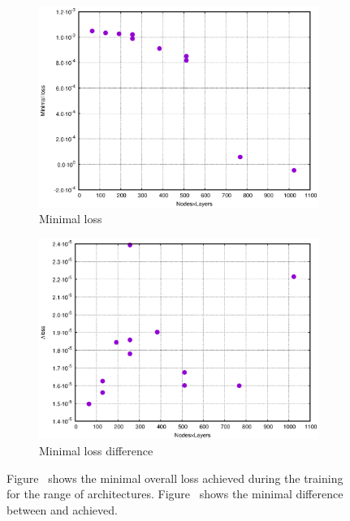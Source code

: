 \begin{figure}[htbp]
    \centering
    \begin{subfigure}[b]{0.45\textwidth}
        \centering
        \includegraphics[width=\textwidth]{figures_simpleNN/minimal_loss.eps}
        \caption{Minimal loss}
        \label{fig:minimal_loss}
    \end{subfigure}%
\quad
    \begin{subfigure}[b]{0.45\textwidth}
        \centering
        \includegraphics[width=\textwidth]{figures_simpleNN/minimal_diff.eps}
        \caption{Minimal loss difference}
        \label{fig:minimal_diff}
    \end{subfigure}
    \caption[Network performance's dependency on the architecture]{Figure~ shows the minimal overall loss achieved during the training for the range of architectures. Figure~ shows the minimal difference between \losstrain and \losstest achieved.}
    \label{fig:net_complexity}
\end{figure}



